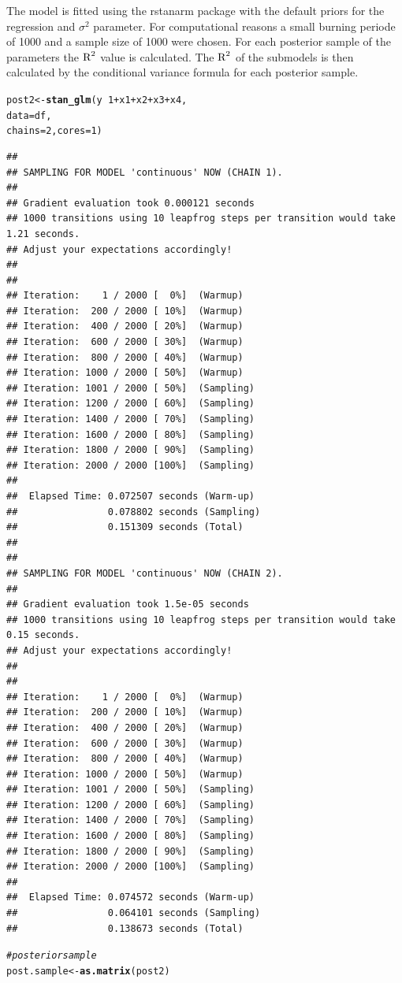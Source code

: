 \documentclass[11pt,a4paper,twoside]{book}\usepackage[]{graphicx}\usepackage[]{color}
\makeatletter
\newcommand{\hlnum}[1]{\textcolor[rgb]{0.686,0.059,0.569}{#1}}%
\newcommand{\hlcom}[1]{\textcolor[rgb]{0.678,0.584,0.686}{\textit{#1}}}%
\newcommand{\hlopt}[1]{\textcolor[rgb]{0,0,0}{#1}}%
\newcommand{\hlstd}[1]{\textcolor[rgb]{0.345,0.345,0.345}{#1}}%
\newcommand{\hlkwb}[1]{\textcolor[rgb]{0.69,0.353,0.396}{#1}}%
\newcommand{\hlkwc}[1]{\textcolor[rgb]{0.333,0.667,0.333}{#1}}%
\newcommand{\hlkwd}[1]{\textcolor[rgb]{0.737,0.353,0.396}{\textbf{#1}}}%
\newenvironment{kframe}{%
 \def\at@end@of@kframe{}%
 \ifinner\ifhmode%
  \def\at@end@of@kframe{\end{minipage}}%
  \begin{minipage}{\columnwidth}%
 \fi\fi%
 \def\FrameCommand##1{\hskip\@totalleftmargin \hskip-\fboxsep
 \colorbox{shadecolor}{##1}\hskip-\fboxsep
     \hskip-\linewidth \hskip-\@totalleftmargin \hskip\columnwidth}%
 \MakeFramed {\advance\hsize-\width
   \@totalleftmargin\z@ \linewidth\hsize
   \@setminipage}}%
 {\par\unskip\endMakeFramed%
 \at@end@of@kframe}
\newenvironment{knitrout}{}{} %
\makeatother
\begin{document}
The model is fitted using the rstanarm package with the default priors for the regression and $\sigma^2$ parameter. For computational reasons a small burning periode of 1000 and a sample size of 1000 were chosen. For each posterior sample of the parameters the $\text{R}^2$ value is calculated. The $\text{R}^2$ of the submodels is then calculated by the conditional variance formula for each posterior sample.


\begin{knitrout}
\color{fgcolor}\begin{kframe}
\begin{alltt}
\hlstd{post2} \hlkwb{<-} \hlkwd{stan_glm}\hlstd{(y} \hlopt{~} \hlnum{1} \hlopt{+} \hlstd{x1} \hlopt{+} \hlstd{x2} \hlopt{+} \hlstd{x3} \hlopt{+} \hlstd{x4,}
                  \hlkwc{data} \hlstd{= df,}
                  \hlkwc{chains} \hlstd{=} \hlnum{2}\hlstd{,} \hlkwc{cores} \hlstd{=} \hlnum{1}\hlstd{)}
\end{alltt}
\begin{verbatim}
## 
## SAMPLING FOR MODEL 'continuous' NOW (CHAIN 1).
## 
## Gradient evaluation took 0.000121 seconds
## 1000 transitions using 10 leapfrog steps per transition would take 1.21 seconds.
## Adjust your expectations accordingly!
## 
## 
## Iteration:    1 / 2000 [  0%]  (Warmup)
## Iteration:  200 / 2000 [ 10%]  (Warmup)
## Iteration:  400 / 2000 [ 20%]  (Warmup)
## Iteration:  600 / 2000 [ 30%]  (Warmup)
## Iteration:  800 / 2000 [ 40%]  (Warmup)
## Iteration: 1000 / 2000 [ 50%]  (Warmup)
## Iteration: 1001 / 2000 [ 50%]  (Sampling)
## Iteration: 1200 / 2000 [ 60%]  (Sampling)
## Iteration: 1400 / 2000 [ 70%]  (Sampling)
## Iteration: 1600 / 2000 [ 80%]  (Sampling)
## Iteration: 1800 / 2000 [ 90%]  (Sampling)
## Iteration: 2000 / 2000 [100%]  (Sampling)
## 
##  Elapsed Time: 0.072507 seconds (Warm-up)
##                0.078802 seconds (Sampling)
##                0.151309 seconds (Total)
## 
## 
## SAMPLING FOR MODEL 'continuous' NOW (CHAIN 2).
## 
## Gradient evaluation took 1.5e-05 seconds
## 1000 transitions using 10 leapfrog steps per transition would take 0.15 seconds.
## Adjust your expectations accordingly!
## 
## 
## Iteration:    1 / 2000 [  0%]  (Warmup)
## Iteration:  200 / 2000 [ 10%]  (Warmup)
## Iteration:  400 / 2000 [ 20%]  (Warmup)
## Iteration:  600 / 2000 [ 30%]  (Warmup)
## Iteration:  800 / 2000 [ 40%]  (Warmup)
## Iteration: 1000 / 2000 [ 50%]  (Warmup)
## Iteration: 1001 / 2000 [ 50%]  (Sampling)
## Iteration: 1200 / 2000 [ 60%]  (Sampling)
## Iteration: 1400 / 2000 [ 70%]  (Sampling)
## Iteration: 1600 / 2000 [ 80%]  (Sampling)
## Iteration: 1800 / 2000 [ 90%]  (Sampling)
## Iteration: 2000 / 2000 [100%]  (Sampling)
## 
##  Elapsed Time: 0.074572 seconds (Warm-up)
##                0.064101 seconds (Sampling)
##                0.138673 seconds (Total)
\end{verbatim}
\begin{alltt}
\hlcom{#posterior sample}
\hlstd{post.sample} \hlkwb{<-} \hlkwd{as.matrix}\hlstd{(post2)}


\end{alltt}
\end{kframe}
\end{knitrout}
\end{document}
